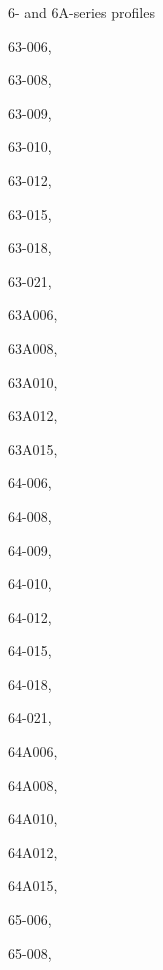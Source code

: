 \documentclass[11pt]{book}
\begin{document}
\begin{theindex}
 6- and 6A-series profiles
 \item 63-006, \hyperref[p63-006]{\pageref{p63-006}}
 \item 63-008, \hyperref[p63-008]{\pageref{p63-008}}
 \item 63-009, \hyperref[p63-009]{\pageref{p63-009}}
 \item 63-010, \hyperref[p63-010]{\pageref{p63-010}}
 \item 63-012, \hyperref[p63-012]{\pageref{p63-012}}
 \item 63-015, \hyperref[p63-015]{\pageref{p63-015}}
 \item 63-018, \hyperref[p63-018]{\pageref{p63-018}}
 \item 63-021, \hyperref[p63-021]{\pageref{p63-021}}
 \item 63A006, \hyperref[p63A006]{\pageref{p63A006}}
 \item 63A008, \hyperref[p63A008]{\pageref{p63A008}}
 \item 63A010, \hyperref[p63A010]{\pageref{p63A010}}
 \item 63A012, \hyperref[p63A012]{\pageref{p63A012}}
 \item 63A015, \hyperref[p63A015]{\pageref{p63A015}}
 \item 64-006, \hyperref[p64-006]{\pageref{p64-006}}
 \item 64-008, \hyperref[p64-008]{\pageref{p64-008}}
 \item 64-009, \hyperref[p64-009]{\pageref{p64-009}}
 \item 64-010, \hyperref[p64-010]{\pageref{p64-010}}
 \item 64-012, \hyperref[p64-012]{\pageref{p64-012}}
 \item 64-015, \hyperref[p64-015]{\pageref{p64-015}}
 \item 64-018, \hyperref[p64-018]{\pageref{p64-018}}
 \item 64-021, \hyperref[p64-021]{\pageref{p64-021}}
 \item 64A006, \hyperref[p64A006]{\pageref{p64A006}}
 \item 64A008, \hyperref[p64A008]{\pageref{p64A008}}
 \item 64A010, \hyperref[p64A010]{\pageref{p64A010}}
 \item 64A012, \hyperref[p64A012]{\pageref{p64A012}}
 \item 64A015, \hyperref[p64A015]{\pageref{p64A015}}
 \item 65-006, \hyperref[p65-006]{\pageref{p65-006}}
 \item 65-008, \hyperref[p65-008]{\pageref{p65-008}}

\end{theindex}
\end{document}
